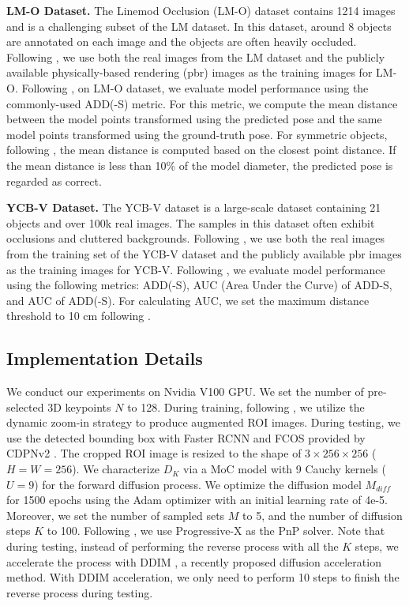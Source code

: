 \documentclass[10pt,twocolumn,letterpaper]{article}
\begin{document}
\noindent\textbf{LM-O Dataset.} 
The Linemod Occlusion (LM-O) dataset contains 1214 images and is a challenging subset of the LM dataset. 
In this dataset, around 8 objects are annotated on each image and the objects are often heavily occluded.
Following \cite{su2022zebrapose, castro2023crt}, we use both the real images from the LM dataset and the publicly available physically-based rendering (pbr) images \cite{denninger2019blenderproc} as the training images for LM-O. Following \cite{wang2021gdr,su2022zebrapose}, on LM-O dataset, we evaluate model performance using the commonly-used ADD(-S) metric.
For this metric, we compute the mean distance between the model points transformed using the predicted pose and the same model points transformed using the ground-truth pose. For symmetric objects, following \cite{xiang2018posecnn}, the mean distance is computed based on the closest point distance.
If the mean distance is less than 10\% of the model diameter, the predicted pose is regarded as correct.

\noindent\textbf{YCB-V Dataset.} The YCB-V dataset is a large-scale dataset containing 21 objects and over 100k real images. 
The samples in this dataset often exhibit occlusions and cluttered backgrounds.
Following \cite{su2022zebrapose,castro2023crt}, we use both the real images from the training set of the YCB-V dataset and the publicly available pbr images as the training images for YCB-V. Following \cite{wang2021gdr,su2022zebrapose}, we evaluate model performance using the following metrics: ADD(-S), AUC (Area Under the Curve) of ADD-S, and AUC of ADD(-S). 
For calculating AUC, we set the maximum distance threshold to 10 cm following \cite{xiang2018posecnn}.

\subsection{Implementation Details}

We conduct our experiments on Nvidia V100 GPU.
We set the number of pre-selected 3D keypoints $N$ to 128.
During training, following \cite{su2022zebrapose, li2019cdpn}, we utilize the dynamic zoom-in strategy to produce augmented ROI images.
During testing, we use the detected bounding box with Faster RCNN \cite{ren2015faster} and FCOS \cite{tian2019fcos} provided by CDPNv2 \cite{li2019cdpn}. 
The cropped ROI image is resized to the shape of $3 \times 256 \times 256 $ ($H=W=256$).
We characterize $D_K$ via a MoC model with 9 Cauchy kernels ($U=9$) for the forward diffusion process.
We optimize the diffusion model $M_{diff}$ for 1500 epochs using the Adam optimizer \cite{kingma2014adam} with an initial learning rate of 4e-5.
Moreover, we set the number of sampled sets $M$ to 5, and the number of diffusion steps $K$ to 100. 
Following \cite{su2022zebrapose}, we use Progressive-X \cite{barath2019progressive} as the PnP solver.
Note that during testing, instead of performing the reverse process with all the $K$ steps, we accelerate the process with DDIM \cite{song2021denoising}, a recently proposed diffusion acceleration method. With DDIM acceleration, we only need to perform 10 steps to finish the reverse process during testing.
\end{document}
